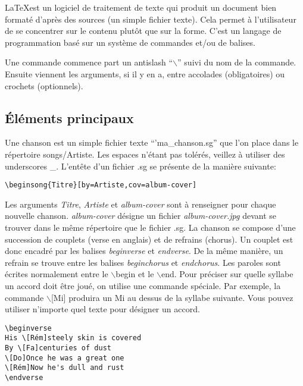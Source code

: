 \documentclass[a4paper]{article}
\begin{document}
\LaTeX est un logiciel de traitement de texte qui produit un document
bien formaté d'après des sources (un simple fichier texte). Cela
permet à l'utilisateur de se concentrer sur le contenu plutôt que sur
la forme. C'est un langage de programmation basé sur un système de
commandes et/ou de balises.

Une commande commence part un antislash ``$\backslash$'' suivi du nom
de la commande. Ensuite viennent les arguments, si il y en a, entre
accolades (obligatoires) ou crochets (optionnels).

\subsection{Éléments principaux}

Une chanson est un simple fichier texte ``'ma\_chanson.sg'' que l'on
place dans le répertoire songs/Artiste. Les espaces n'étant
pas tolérés, veillez à utiliser des underscores \_. L'entête d'un fichier
.sg se présente de la manière suivante:

\begin{verbatim}
\beginsong{Titre}[by=Artiste,cov=album-cover]
\end{verbatim}

Les arguments \emph{Titre}, \emph{Artiste} et \emph{album-cover} sont
à renseigner pour chaque nouvelle chanson. \emph{album-cover} désigne
un fichier \emph{album-cover.jpg} devant se trouver dans le même
répertoire que le fichier .sg.  La chanson se compose d'une succession
de couplets (verse en anglais) et de refrains (chorus). Un couplet est
donc encadré par les balises \emph{beginverse} et \emph{endverse}. De
la même manière, un refrain se trouve entre les balises
\emph{beginchorus} et \emph{endchorus}.  Les paroles sont écrites
normalement entre le $\backslash$begin et le $\backslash$end. Pour
préciser sur quelle syllabe un accord doit être joué, on utilise une
commande spéciale. Par exemple, la commande $\backslash$[Mi] produira
un Mi au dessus de la syllabe suivante. Vous pouvez utiliser n'importe
quel texte pour désigner un accord.

\begin{center}
\begin{verbatim}
\beginverse
His \[Rém]steely skin is covered
By \[Fa]centuries of dust
\[Do]Once he was a great one
\[Rém]Now he's dull and rust
\endverse
\end{verbatim}
\end{center}
\end{document}

